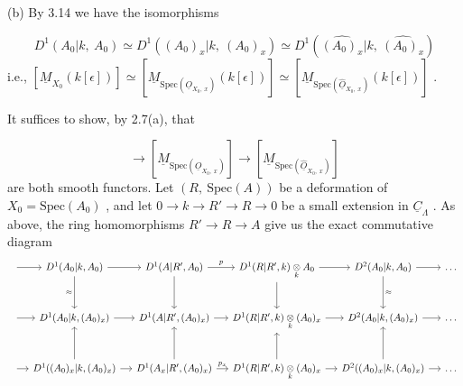 (b)  By 3.14 we have the isomorphisms

\begin{equation*}
D^1(A_0|k,\ A_0) \simeq D^1((A_0)_x|k,\ (A_0)_x) \simeq D^1(\widehat{(A_0)_x}|k,\ \widehat{(A_0)_x})
\end{equation*}
i.e.,   $[\underline{M}_{X_0}(k[\epsilon])] \simeq [\underline{M}_{\mathrm{Spec}(\underline{O}_{X_0,\ x})}(k[\epsilon])] \simeq [\underline{M}_{\mathrm{Spec}(\widehat{\underline{O}}_{X_0,\ x})}(k[\epsilon])]$ .

It suffices to show, by 2.7(a), that

\begin{equation*}
[\underline{M}_{X_0}] \to [\underline{M}_{\mathrm{Spec}(\underline{O}_{X_0,\ x})}] \to [\underline{M}_{\mathrm{Spec}(\widehat{\underline{O}}_{X_0,\ x})}]
\end{equation*}
are both smooth functors. Let  $(R,\ \mathrm{Spec}(A))$  be a deformation of  $X_0 = \mathrm{Spec}(A_0)$  , and let  $0 \to k \to R' \to R \to 0$  be a small extension in  $\underline{C}_{\Lambda}$  . As above, the ring homomorphisms  $R' \to R \to A$  give us the exact commutative diagram
{\small
\[
\begin{tikzcd}[column sep=small, row sep=large]
{} \arrow[r] & D^1(A_0|k,A_0) \arrow[r] \arrow[d, "\approx"'] & D^1(A|R',A_0) \arrow[r, "p"] \arrow[d] & D^1(R|R',k)\underset{k}{\otimes}A_0 \arrow[r] \arrow[d] & D^2(A_0|k,A_0) \arrow[r] \arrow[d, "\approx"] & \dots \\
{} \arrow[r] & D^1(A_0|k,(A_0)_x) \arrow[r] & D^1(A|R',(A_0)_x) \arrow[r] & D^1(R|R',k)\underset{k}{\otimes}(A_0)_x \arrow[r] & D^2(A_0|k,(A_0)_x) \arrow[r] & \dots \\
{} \arrow[r] & D^1((A_0)_x|k,(A_0)_x) \arrow[r] \arrow[u] & D^1(A_x|R',(A_0)_x) \arrow[r, "p_x"] \arrow[u] & D^1(R|R',k)\underset{k}{\otimes}(A_0)_x \arrow[r] \arrow[u] & D^2((A_0)_x|k,(A_0)_x) \arrow[r] \arrow[u] & \dots
\end{tikzcd}
\]}
